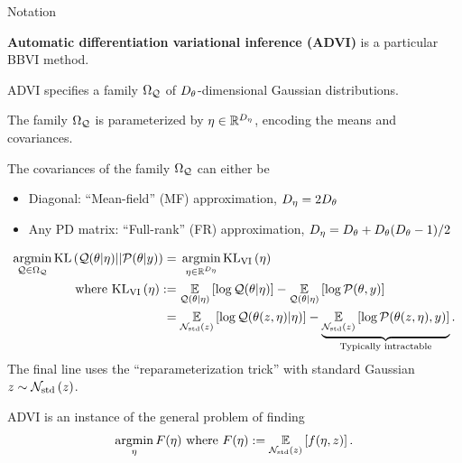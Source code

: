 \documentclass[8pt]{beamer}\usepackage[]{graphicx}\usepackage[]{color}
\begin{document}
\begin{frame}[t]{Notation}
%


\textbf{Automatic differentiation variational inference (ADVI)}
is a particular BBVI method.

ADVI specifies a family $\Omega_{\mathcal{Q}}$ of ${D_{\theta}}$-dimensional
Gaussian distributions.

The family $\Omega_{\mathcal{Q}}$ is parameterized by 
$\eta \in \mathbb{R}^{D_{\eta}}$, 
encoding the means and covariances.

The covariances of the family $\Omega_{\mathcal{Q}}$ can either be
%
\begin{itemize}
\item Diagonal: ``Mean-field'' (MF) approximation, ${D_{\eta}} = 2 {D_{\theta}}$
\item Any PD matrix: 
    ``Full-rank'' (FR) approximation, 
        ${D_{\eta}} = {D_{\theta}} + {D_{\theta}}  ({D_{\theta}} - 1) / 2$
\end{itemize}
%
%
\begin{align*}
%
\argmin_{\q \in \qdom} 
\mathrm{KL}\left(\q(\theta | \eta) || \post \right) ={}&
\argmin_{\eta \in \etadom} \klfullobj{\eta} 
\\ \textrm{where }
\klfullobj{\eta} :={}&
\expect{\q(\theta \vert \eta)}{\log \q(\theta \vert \eta)}
-\expect{\q(\theta \vert \eta)}{\logjoint}
\\={}&
\expect{\normz}{\log \q(\theta(\z, \eta) \vert \eta)} -
\undernote{\expect{\normz}{\log \p(\theta(\z, \eta), \y)}}
{\text{Typically intractable}}.
%
\end{align*}
%
The final line uses the ``reparameterization trick''
with standard Gaussian $z \sim \mathcal{N}_{\mathrm{std}}\left(z\right)$. 

\hrulefill

ADVI is an instance of the general problem of finding
%
\begin{align*}
%
\argmin_{\eta} F(\eta)
\text{ where } F(\eta) := \expect{\normz}{f(\eta, \z)}.
%
\end{align*}


\end{frame}


\end{document}
